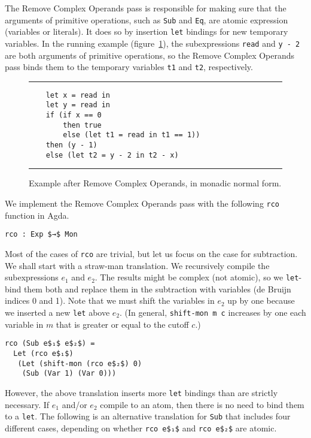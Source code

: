 \documentclass[sigplan,review,dvipsnames,screen,10pt]{acmart}
\begin{document}
The Remove Complex Operands pass is responsible for making sure that
the arguments of primitive operations, such as \lstinline{Sub} and
\lstinline{Eq}, are atomic expression (variables or literals). It does
so by insertion \lstinline{let} bindings for new temporary variables.
In the running example (figure~\ref{fig:running-example-monadic}), the
subexpressions \lstinline{read} and \lstinline{y - 2} are both
arguments of primitive operations, so the Remove Complex Operands pass
binds them to the temporary variables \lstinline{t1} and
\lstinline{t2}, respectively.

\begin{figure}[tp]
  \hrule
\begin{lstlisting}
    let x = read in
    let y = read in
    if (if x == 0
        then true
        else (let t1 = read in t1 == 1))
    then (y - 1)
    else (let t2 = y - 2 in t2 - x)
\end{lstlisting}
  \hrule
\caption{Example after Remove Complex Operands, in
  monadic normal form.}
\label{fig:running-example-monadic}
\end{figure}

We implement the Remove Complex Operands pass with the following
\lstinline{rco} function in Agda.
\begin{lstlisting}
rco : Exp $→$ Mon
\end{lstlisting}

Most of the cases of \lstinline{rco} are trivial, but let us focus on
the case for subtraction. We shall start with a straw-man
translation. We recursively compile the subexpressions $e_1$ and
$e_2$. The results might be complex (not atomic), so we
\lstinline{let}-bind them both and replace them in the subtraction
with variables (de Bruijn indices 0 and 1). Note that we must shift
the variables in $e_2$ up by one because we inserted a new
\lstinline{let} above $e_2$. (In general, \lstinline{shift-mon m c}
increases by one each variable in $m$ that is greater or equal to the
cutoff $c$.)

\begin{lstlisting}
rco (Sub e$₁$ e$₂$) =
  Let (rco e$₁$)
   (Let (shift-mon (rco e$₂$) 0)
    (Sub (Var 1) (Var 0)))
\end{lstlisting}

However, the above translation inserts more \lstinline{let} bindings
than are strictly necessary. If $e_1$ and/or $e_2$ compile to an atom,
then there is no need to bind them to a \lstinline{let}.  The
following is an alternative translation for \lstinline{Sub} that
includes four different cases, depending on whether \lstinline{rco e$₁$}
and \lstinline{rco e$₂$} are atomic.
\end{document}
